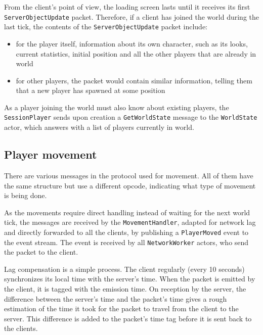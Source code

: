 \documentclass[paper=a4, fontsize=11pt]{scrartcl}
\begin{document}
\begin{sloppypar}

From the client's point of view, the loading screen lasts until it receives its
first \texttt{ServerObjectUpdate} packet.
Therefore, if a client has joined the world during the last tick, the contents
of the \texttt{ServerObjectUpdate} packet include:
\begin{itemize}
    \item for the player itself, information about its
        own character, such as its looks, current statistics, initial
        position and all the other players that are already in world
    \item for other players, the packet would contain similar information,
        telling them that a new player has spawned at some position
\end{itemize}

\end{sloppypar}

As a player joining the world must also know about existing players, the
\texttt{SessionPlayer} sends upon creation a \texttt{GetWorldState} message to
the \texttt{WorldState} actor, which answers with a list of players currently in
world.

\subsection{Player movement}

There are various messages in the protocol used for movement.
All of them have the same structure but use a different opcode, indicating what
type of movement is being done.

As the movements require direct handling instead of waiting for the next world
tick, the messages are received by the \texttt{MovementHandler}, adapted for
network lag and directly forwarded to all the clients, by publishing a
\texttt{PlayerMoved} event to the event stream.
The event is received by all \texttt{NetworkWorker} actors, who send the packet
to the client.

Lag compensation is a simple process.
The client regularly (every 10 seconds) synchronizes its local time with the
server's time.
When the packet is emitted by the client, it is tagged with the emission time.
On reception by the server, the difference between the server's time and the
packet's time gives a rough estimation of the time it took for the packet to
travel from the client to the server. 
This difference is added to the packet's time tag before it is sent back to
the clients.
\end{document}
